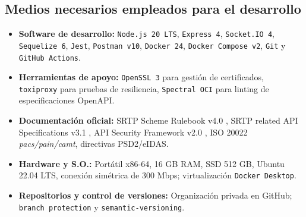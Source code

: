 \subsection{Medios necesarios empleados para el desarrollo}
\label{subsec:Medios}
\begin{itemize}
  \item \textbf{Software de desarrollo:}  
        \texttt{Node.js 20 LTS}, \texttt{Express 4}, \texttt{Socket.IO 4},
        \texttt{Sequelize 6}, \texttt{Jest}, \texttt{Postman v10},
        \texttt{Docker 24}, \texttt{Docker Compose v2},
        \texttt{Git} y \texttt{GitHub Actions}.
  \item \textbf{Herramientas de apoyo:}  
        \texttt{OpenSSL 3} para gestión de certificados,
        \texttt{toxiproxy} para pruebas de resiliencia,
        \texttt{Spectral OCI} para linting de especificaciones OpenAPI.
  \item \textbf{Documentación oficial:}  
        SRTP Scheme Rulebook v4.0 \cite{epc014},  
        SRTP related API Specifications v3.1 \cite{epc137},  
        API Security Framework v2.0 \cite{epc164},  
        ISO 20022 \emph{pacs/pain/camt},  
        directivas PSD2/eIDAS.
  \item \textbf{Hardware y S.O.:}  
        Portátil x86-64, 16 GB RAM, SSD 512 GB, Ubuntu 22.04 LTS, conexión
        simétrica de 300 Mbps; virtualización \texttt{Docker Desktop}.
  \item \textbf{Repositorios y control de versiones:}  
        Organización privada en GitHub; \texttt{branch protection} y
        \texttt{semantic-versioning}.
\end{itemize}